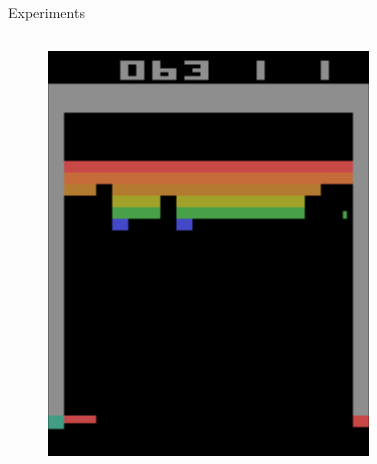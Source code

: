 \begin{frame}{Experiments}
\begin{columns}[c,onlytextwidth]
\begin{figure}
            \includegraphics[width=\textwidth]{images/atari-sequence-2.png}
        \end{figure}
    \end{columns}
\end{frame}

